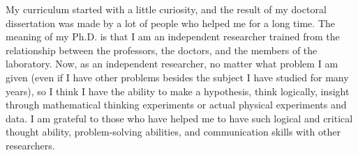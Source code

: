 


My curriculum started with a little curiosity, and the result of my doctoral dissertation was made by a lot of people who helped me for a long time. The meaning of my Ph.D. is that I am an independent researcher trained from the relationship between the professors, the doctors, and the members of the laboratory. Now, as an independent researcher, no matter what problem I am given (even if I have other problems besides the subject I have studied for many years), so I think I have the ability to make a hypothesis, think logically, insight through mathematical thinking experiments or actual physical experiments and data. I am grateful to those who have helped me to have such logical and critical thought ability, problem-solving abilities, and communication skills with other researchers. 

